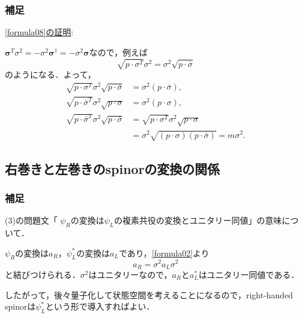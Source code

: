\documentclass[pdflatex,unicode,ja=standard,12pt]{beamer}
\begin{document}
\begin{frame}[noframenumbering]

  \frametitle{補足 \subsecname}
  \thispagestyle{empty}

  \uline{\eqref{formula08}の証明}:

  \vspace{5pt}

  $\bm{\sigma}^{T}\sigma^2=-\sigma^2\bm{\sigma}^{\dag}=-\sigma^2\bm{\sigma}$なので，例えば
  \begin{equation}
    \sqrt{p\cdot\sigma^{T}}\sigma^2
    =
    \sigma^2\sqrt{p\cdot\bar{\sigma}}
  \end{equation}
  のようになる．よって，
  \begin{align}
    \sqrt{p\cdot\sigma^{T}}
    \sigma^2
    \sqrt{p\cdot\bar{\sigma}}
    &=
    \sigma^2
    (p\cdot\bar{\sigma})
    \nonumber
    ,
    \\
    \sqrt{p\cdot\bar{\sigma}^{T}}
    \sigma^2
    \sqrt{p\cdot\sigma}
    &=
    \sigma^2
    (p\cdot\sigma)
    \nonumber
    ,
    \\
    \sqrt{p\cdot\bar{\sigma}^{T}}
    \sigma^2
    \sqrt{p\cdot\bar{\sigma}}
    &=
    \sqrt{p\cdot\sigma^{T}}
    \sigma^2
    \sqrt{p\cdot\sigma}
    \nonumber
    \\
    &=
    \sigma^2\sqrt{(p\cdot\sigma)(p\cdot\bar{\sigma})}
    =
    m\sigma^2
    .
  \end{align}

\end{frame}


\subsection{右巻きと左巻きのspinorの変換の関係}
\label{unitary}

\begin{frame}[noframenumbering]
  
  \frametitle{補足 \subsecname}
  \thispagestyle{empty}

  (3)の問題文「 $\psi_{R}$の変換は$\psi_{L}$の複素共役の変換とユニタリー同値」の意味について．

  \vspace{10pt}

  $\psi_{R}$の変換は$a_R$，$\psi_L^*$の変換は$a_L$であり，\eqref{formula02}より
  \begin{equation}
    a_R
    =
    \sigma^2 a_L \sigma^2
  \end{equation}
  と結びつけられる．$\sigma^2$はユニタリーなので，$a_R$と$a_L^*$はユニタリー同値である．

  \vspace{10pt}

  したがって，後々量子化して状態空間を考えることになるので，right-handed spinorは$\psi_L^*$という形で導入すればよい．

\end{frame}
\end{document}
